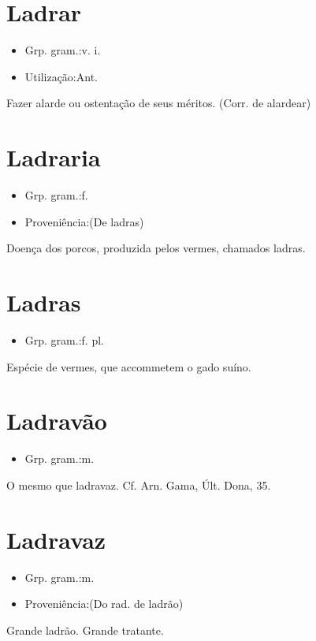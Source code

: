 \section{Ladrar}
\begin{itemize}
\item {Grp. gram.:v. i.}
\end{itemize}
\begin{itemize}
\item {Utilização:Ant.}
\end{itemize}
Fazer alarde ou ostentação de seus méritos.
(Corr. de \textunderscore alardear\textunderscore )
\section{Ladraria}
\begin{itemize}
\item {Grp. gram.:f.}
\end{itemize}
\begin{itemize}
\item {Proveniência:(De \textunderscore ladras\textunderscore )}
\end{itemize}
Doença dos porcos, produzida pelos vermes, chamados ladras.
\section{Ladras}
\begin{itemize}
\item {Grp. gram.:f. pl.}
\end{itemize}
Espécie de vermes, que accommetem o gado suíno.
\section{Ladravão}
\begin{itemize}
\item {Grp. gram.:m.}
\end{itemize}
O mesmo que \textunderscore ladravaz\textunderscore . Cf. Arn. Gama, \textunderscore Últ. Dona\textunderscore , 35.
\section{Ladravaz}
\begin{itemize}
\item {Grp. gram.:m.}
\end{itemize}
\begin{itemize}
\item {Proveniência:(Do rad. de \textunderscore ladrão\textunderscore )}
\end{itemize}
Grande ladrão.
Grande tratante.
